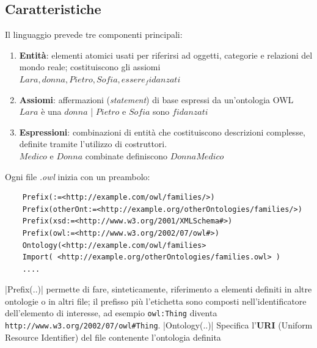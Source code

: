 \subsection{Caratteristiche}
Il linguaggio prevede tre componenti principali:
\begin{enumerate}
	\item \textbf{Entità}: elementi atomici usati per riferirsi ad oggetti, categorie e relazioni 
	del mondo reale; costituiscono gli assiomi\\ 
	$Lara,donna,Pietro,Sofia,essere_fidanzati$ 
	\item \textbf{Assiomi}: affermazioni (\textit{statement}) di base espressi da un'ontologia OWL
	$Lara$ è una $donna$ | $ Pietro $ e $ Sofia $ sono $ fidanzati $
	\item \textbf{Espressioni}: combinazioni di entità che costituiscono descrizioni complesse, definite
	tramite l'utilizzo di costruttori. \\
	$ Medico $ e $ Donna $ combinate definiscono $ Donna Medico $ 
\end{enumerate}
 
Ogni file \textit{.owl} inizia con un preambolo: \label{code:preambolo}
\begin{verbatim} 
	Prefix(:=<http://example.com/owl/families/>)
	Prefix(otherOnt:=<http://example.org/otherOntologies/families/>)
	Prefix(xsd:=<http://www.w3.org/2001/XMLSchema#>)
	Prefix(owl:=<http://www.w3.org/2002/07/owl#>)
	Ontology(<http://example.com/owl/families>
	Import( <http://example.org/otherOntologies/families.owl> )
	....
\end{verbatim} 
|Prefix(..)| permette di fare, sinteticamente, riferimento a elementi definiti in altre ontologie o in altri file; il prefisso più l'etichetta sono composti nell'identificatore dell'elemento di interesse, ad esempio
\texttt{owl:Thing} diventa \texttt{http://www.w3.org/2002/07/owl#Thing}.
|Ontology(..)| Specifica l'\textbf{URI} (Uniform Resource Identifier) del file contenente l'ontologia
definita
